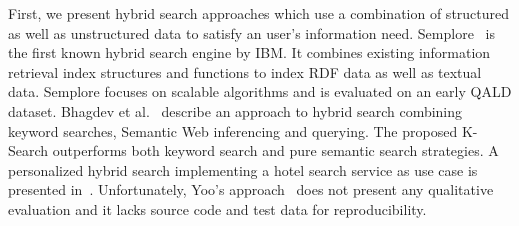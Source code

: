 First, we present hybrid search approaches which use a combination of structured as well as unstructured data to satisfy an user's information need. 
Semplore~\cite{Zhang:2007a} is the first known hybrid search engine by IBM.
It combines existing information retrieval index structures and functions to index RDF data as well as textual data. 
Semplore focuses on scalable algorithms and is evaluated on an early QALD dataset.
Bhagdev et al.~\cite{Bhagdev:2008:HSE} describe an approach to hybrid search combining keyword searches, Semantic Web inferencing and querying. 
The proposed K-Search outperforms both keyword search and pure semantic search strategies.
A personalized hybrid search implementing a  hotel search service as use case is presented in~\cite{DBLP:journals/kbs/Yoo12}. 
Unfortunately, Yoo's approach~\cite{DBLP:journals/kbs/Yoo12} does not present any qualitative evaluation and it lacks source code and test data for reproducibility. 

